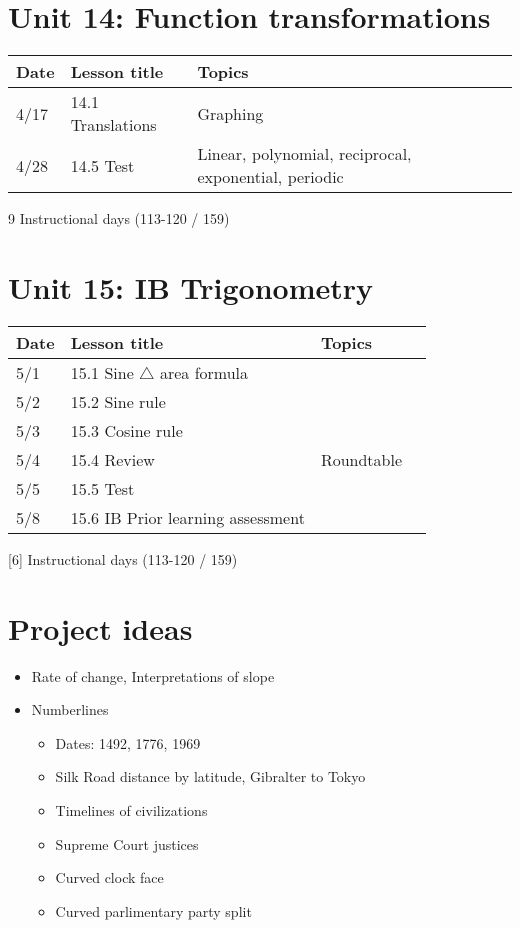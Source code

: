 \section*{Unit 14: Function transformations}
\begin{tabular}{|p{0.9cm}|p{4cm}|p{7cm}|p{5cm}|}
  \hline
  Date & Lesson title & Topics  &  \\
  \hline
  4/17 & 14.1 Translations & Graphing &  \\
  \hline
  4/28 & 14.5 Test & Linear, polynomial, reciprocal, exponential, periodic &  \\
  \hline


\end{tabular} \par \vspace*{0.3cm}
9 Instructional days (113-120 / 159)

\section*{Unit 15: IB Trigonometry}
\begin{tabular}{|p{0.9cm}|p{4cm}|p{7cm}|p{5cm}|}
  \hline
  Date & Lesson title & Topics  &  \\
  \hline
  5/1 & 15.1 Sine $\triangle$ area formula &  &  \\
  \hline
  5/2 & 15.2 Sine rule &  &  \\
  \hline
  5/3 & 15.3 Cosine rule &  &  \\
  \hline
  5/4 & 15.4 Review & Roundtable &  \\
  \hline
  5/5 & 15.5 Test &  &  \\
  \hline
  5/8 & 15.6 IB Prior learning assessment &  &  \\
  \hline

\end{tabular} \par \vspace*{0.3cm}
[6] Instructional days (113-120 / 159)

\newpage
\section*{Project ideas}
\begin{itemize}
  \item Rate of change, Interpretations of slope
  \item Numberlines
  \begin{itemize}
    \item Dates: 1492, 1776, 1969
    \item Silk Road distance by latitude, Gibralter to Tokyo
    \item Timelines of civilizations
    \item Supreme Court justices
    \item Curved clock face 
    \item Curved parlimentary party split
  \end{itemize}
\end{itemize}

